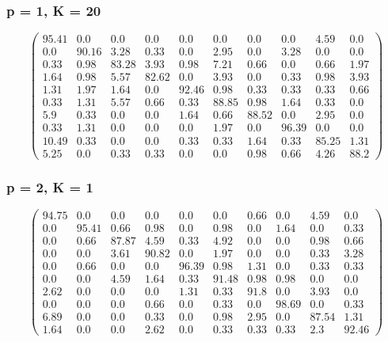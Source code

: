 \begin{appendices}
\subsubsection*{p = 1, K = 20}
$$\begin{pmatrix}
95.41&0.0&0.0&0.0&0.0&0.0&0.0&0.0&4.59&0.0\\
0.0&90.16&3.28&0.33&0.0&2.95&0.0&3.28&0.0&0.0\\
0.33&0.98&83.28&3.93&0.98&7.21&0.66&0.0&0.66&1.97\\
1.64&0.98&5.57&82.62&0.0&3.93&0.0&0.33&0.98&3.93\\
1.31&1.97&1.64&0.0&92.46&0.98&0.33&0.33&0.33&0.66\\
0.33&1.31&5.57&0.66&0.33&88.85&0.98&1.64&0.33&0.0\\
5.9&0.33&0.0&0.0&1.64&0.66&88.52&0.0&2.95&0.0\\
0.33&1.31&0.0&0.0&0.0&1.97&0.0&96.39&0.0&0.0\\
10.49&0.33&0.0&0.0&0.33&0.33&1.64&0.33&85.25&1.31\\
5.25&0.0&0.33&0.33&0.0&0.0&0.98&0.66&4.26&88.2
\end{pmatrix}$$

\subsubsection*{p = 2, K = 1}
$$\begin{pmatrix}
94.75&0.0&0.0&0.0&0.0&0.0&0.66&0.0&4.59&0.0\\
0.0&95.41&0.66&0.98&0.0&0.98&0.0&1.64&0.0&0.33\\
0.0&0.66&87.87&4.59&0.33&4.92&0.0&0.0&0.98&0.66\\
0.0&0.0&3.61&90.82&0.0&1.97&0.0&0.0&0.33&3.28\\
0.0&0.66&0.0&0.0&96.39&0.98&1.31&0.0&0.33&0.33\\
0.0&0.0&4.59&1.64&0.33&91.48&0.98&0.98&0.0&0.0\\
2.62&0.0&0.0&0.0&1.31&0.33&91.8&0.0&3.93&0.0\\
0.0&0.0&0.0&0.66&0.0&0.33&0.0&98.69&0.0&0.33\\
6.89&0.0&0.0&0.33&0.0&0.98&2.95&0.0&87.54&1.31\\
1.64&0.0&0.0&2.62&0.0&0.33&0.33&0.33&2.3&92.46
\end{pmatrix}$$


\end{appendices}
